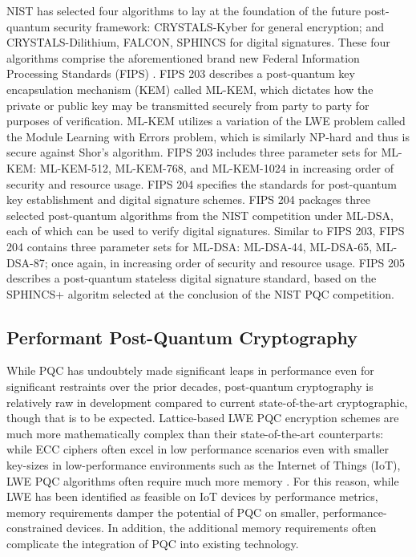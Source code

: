 \documentclass[12pt]{article}
\begin{document}
NIST has selected four algorithms to lay at the foundation of the future post-quantum security framework: CRYSTALS-Kyber for general encryption; and CRYSTALS-Dilithium, FALCON, SPHINCS for digital signatures. 
These four algorithms comprise the aforementioned brand new Federal Information Processing Standards (FIPS) \autocite{noauthor_nist_2022}.
FIPS 203 describes a post-quantum key encapsulation mechanism (KEM) called ML-KEM, which dictates how the private or public key may be transmitted securely from party to party for purposes of verification. 
ML-KEM utilizes a variation of the LWE problem called the Module Learning with Errors problem, which is similarly NP-hard and thus is secure against Shor's algorithm. 
FIPS 203 includes three parameter sets for ML-KEM: ML-KEM-512, ML-KEM-768, and ML-KEM-1024 in increasing order of security and resource usage. \autocite{noauthor_module-lattice-based_2023}
FIPS 204 specifies the standards for post-quantum key establishment and digital signature schemes. 
FIPS 204 packages three selected post-quantum algorithms from the NIST competition under ML-DSA, each of which can be used to verify digital signatures. 
Similar to FIPS 203, FIPS 204 contains three parameter sets for ML-DSA: ML-DSA-44, ML-DSA-65, ML-DSA-87; once again, in increasing order of security and resource usage. \autocite{noauthor_module-lattice-based_2023-1}
FIPS 205 \autocite{noauthor_stateless_2023} describes a post-quantum stateless digital signature standard, based on the SPHINCS+ algoritm selected at the conclusion of the NIST PQC competition. \autocite{noauthor_nist_2022} 

\subsection{Performant Post-Quantum Cryptography}
While PQC has undoubtely made significant leaps in performance even for significant restraints \autocite{guillen_towards_2017} over the prior decades, post-quantum cryptography is relatively raw in development \autocite{p_c_analysis_2022} compared to current state-of-the-art cryptographic, though that is to be expected. 
Lattice-based LWE PQC encryption schemes are much more mathematically complex than their state-of-the-art counterparts: while ECC ciphers often excel in low performance scenarios \autocite{dhillon_elliptic_2016} even with smaller key-sizes in low-performance environments such as the Internet of Things (IoT), LWE PQC algorithms often require much more memory \autocite{schoffel_energy_2021}. 
For this reason, while LWE has been identified as feasible on IoT devices \autocite{akleylek_new_2022} by performance metrics, memory requirements damper the potential of PQC on smaller, performance-constrained devices. \autocite{ristov_quantum_2023}
In addition, the additional memory requirements often complicate the integration of PQC into existing technology.
\end{document}
